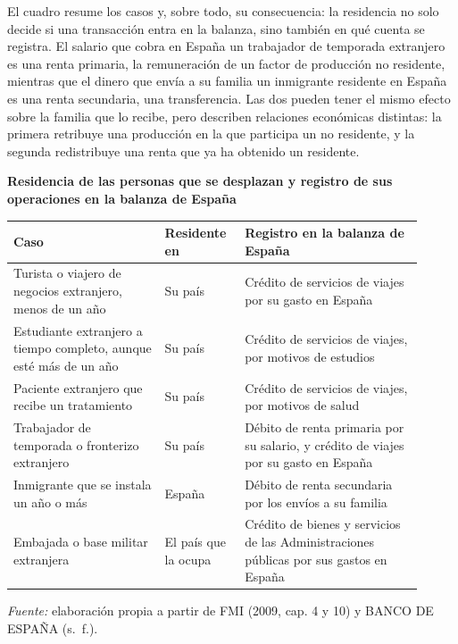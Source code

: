 \documentclass[10pt,a4paper]{article}
\begin{document}
El cuadro resume los casos y, sobre todo, su consecuencia: la residencia no solo decide si una transacción entra en la balanza, sino también en qué cuenta se registra. El salario que cobra en España un trabajador de temporada extranjero es una renta primaria, la remuneración de un factor de producción no residente, mientras que el dinero que envía a su familia un inmigrante residente en España es una renta secundaria, una transferencia. Las dos pueden tener el mismo efecto sobre la familia que lo recibe, pero describen relaciones económicas distintas: la primera retribuye una producción en la que participa un no residente, y la segunda redistribuye una renta que ya ha obtenido un residente.

\begin{center}\begin{minipage}{\linewidth}\centering
{\small\textbf{Residencia de las personas que se desplazan y registro de sus operaciones en la balanza de España}}\par\vspace{0.3em}
\footnotesize
\begin{tabular}{p{0.34\linewidth}p{0.17\linewidth}p{0.40\linewidth}}
\hline
Caso & Residente en & Registro en la balanza de España\\
\hline
Turista o viajero de negocios extranjero, menos de un año & Su país & Crédito de servicios de viajes por su gasto en España\\
Estudiante extranjero a tiempo completo, aunque esté más de un año & Su país & Crédito de servicios de viajes, por motivos de estudios\\
Paciente extranjero que recibe un tratamiento & Su país & Crédito de servicios de viajes, por motivos de salud\\
Trabajador de temporada o fronterizo extranjero & Su país & Débito de renta primaria por su salario, y crédito de viajes por su gasto en España\\
Inmigrante que se instala un año o más & España & Débito de renta secundaria por los envíos a su familia\\
Embajada o base militar extranjera & El país que la ocupa & Crédito de bienes y servicios de las Administraciones públicas por sus gastos en España\\
\hline
\end{tabular}\par\vspace{0.3em}
{\small\textit{Fuente: }elaboración propia a partir de FMI (2009, cap. 4 y 10) y BANCO DE ESPAÑA (s.~f.).}
\end{minipage}\end{center}
\end{document}
